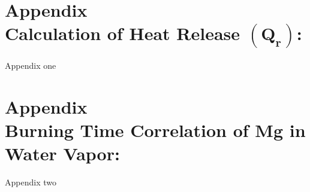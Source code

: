 \renewcommand{\theequation}{A.\arabic{equation}}

\chapter*{\textbf{Appendix  \\ Calculation of Heat Release $\boldsymbol{(Q_r)}$:}}
\label{chap:appendix1}


Appendix one


\chapter*{\textbf{Appendix  \\ Burning Time Correlation of Mg in Water Vapor:}}
\setcounter{equation}{0} %
\label{appendix2}

Appendix two
